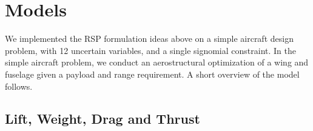 \documentclass{article}
\renewcommand{\vec}{\mathbf}
\begin{document}

\section{Models}

We implemented the RSP formulation ideas above on a simple aircraft design problem, with 12 uncertain variables, and a single signomial constraint. In the simple aircraft problem, we conduct an aerostructural optimization of a wing and fuselage given a payload and range requirement. A short overview of the model follows. 

\subsection{Lift, Weight, Drag and Thrust}
\end{document}
